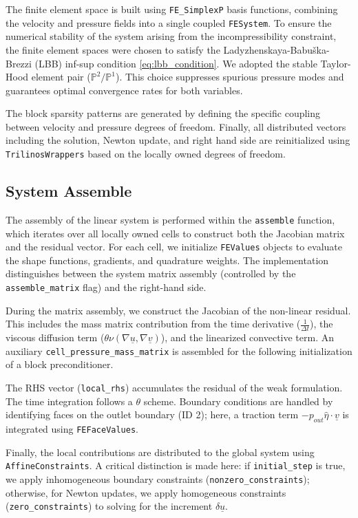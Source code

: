 \documentclass[11pt,a4paper]{article}
\renewcommand{\vec}[1]{\underline{#1}} %
\begin{document}
The finite element space is built using \texttt{FE\_SimplexP} basis functions, combining the velocity and pressure fields into a single coupled \texttt{FESystem}. To ensure the numerical stability of the system arising from the incompressibility constraint, the finite element spaces were chosen to satisfy the Ladyzhenskaya-Babuška-Brezzi (LBB) inf-sup condition \ref{eq:lbb_condition}. We adopted the stable Taylor-Hood element pair ($\mathbb{P}^{2}/\mathbb{P}^{1}$). This choice suppresses spurious pressure modes and guarantees optimal convergence rates for both variables. 

The block sparsity patterns are generated by defining the specific coupling between velocity and pressure degrees of freedom. Finally, all distributed vectors including the solution, Newton update, and right hand side are reinitialized using \texttt{TrilinosWrappers} based on the locally owned degrees of freedom.

\subsection{System Assemble}
The assembly of the linear system is performed within the \texttt{assemble} function, which iterates over all locally owned cells to construct both the Jacobian matrix and the residual vector. For each cell, we initialize \texttt{FEValues} objects to evaluate the shape functions, gradients, and quadrature weights. The implementation distinguishes between the system matrix assembly (controlled by the \texttt{assemble\_matrix} flag) and the right-hand side.

During the matrix assembly, we construct the Jacobian of the non-linear residual. This includes the mass matrix contribution from the time derivative ($\frac{1}{\Delta t}$), the viscous diffusion term ($\theta \nu (\nabla \vec{u}, \nabla \vec{v})$), and the linearized convective term. An auxiliary \texttt{cell\_pressure\_mass\_matrix} is assembled for the following initialization of a block preconditioner.

The RHS vector (\texttt{local\_rhs}) accumulates the residual of the weak formulation. The time integration follows a $\theta$ scheme. Boundary conditions are handled by identifying faces on the outlet boundary (ID 2); here, a traction term $-p_{out} \hat{\eta} \cdot \vec{v}$ is integrated using \texttt{FEFaceValues}.

Finally, the local contributions are distributed to the global system using \texttt{AffineConstraints}. A critical distinction is made here: if \texttt{initial\_step} is true, we apply inhomogeneous boundary constraints (\texttt{nonzero\_constraints}); otherwise, for Newton updates, we apply homogeneous constraints (\texttt{zero\_constraints}) to solving for the increment $\delta \vec{u}$.
\end{document}
